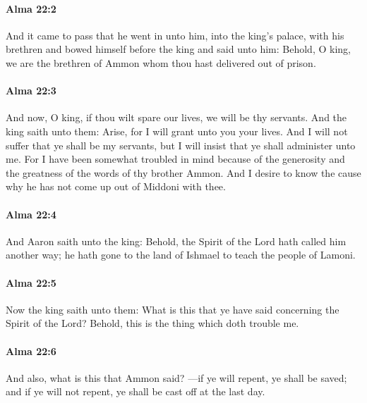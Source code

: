 		\paragraph{Alma 22:2} %
			\label{ALMA-22-2}

			And it came to pass that he went in unto him,
			into the king's palace, with his brethren
			and bowed himself before the king and said unto him:
			Behold, O king, we are the brethren of Ammon
			whom thou hast delivered out of prison.

		\paragraph{Alma 22:3} %
			\label{ALMA-22-3}

			And now, O king, if thou wilt spare our lives, we will be thy servants.
			And the king saith unto them:
			Arise, for I will grant unto you your lives.
			And I will not suffer that ye shall be my servants,
			but I will insist that ye shall administer unto me.
			For I have been somewhat troubled in mind
			because of the generosity and the greatness of the words of thy brother Ammon.
			And I desire to know the cause why he has not come up out of Middoni with thee.

		\paragraph{Alma 22:4} %
			\label{ALMA-22-4}

			And Aaron saith unto the king:
			Behold, the Spirit of the Lord hath called him another way;
			he hath gone to the land of Ishmael to teach the people of Lamoni.

		\paragraph{Alma 22:5} %
			\label{ALMA-22-5}

			Now the king saith unto them:
			What is this that ye have said concerning the Spirit of the Lord?
			Behold, this is the thing which doth trouble me.

		\paragraph{Alma 22:6} %
			\label{ALMA-22-6}

			And also, what is this that Ammon said?
			---if ye will repent, ye shall be saved;
			and if ye will not repent, ye shall be cast off at the last day.

